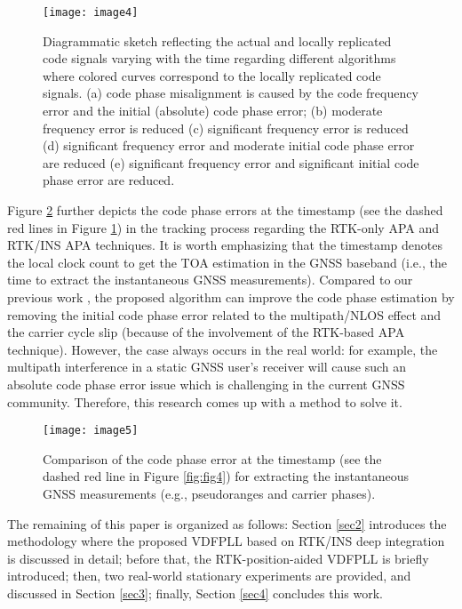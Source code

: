\documentclass{article}
\newcommand{\reffig}[1]{Figure \ref{#1}}
\begin{document}
\begin{figure}[htbp]%
\centerline{\texttt{[image: image4]}}%
\caption{Diagrammatic sketch reflecting the actual and locally replicated code signals varying with the time regarding different algorithms where colored curves correspond to the locally replicated code signals. (a) code phase misalignment is caused by the code frequency error and the initial (absolute) code phase error; (b) moderate frequency error is reduced (c) significant frequency error is reduced (d) significant frequency error and moderate initial code phase error are reduced (e) significant frequency error and significant initial code phase error are reduced.}%
\label{fig:fig1}%
\end{figure}


\reffig{fig:fig2} further depicts the code phase errors at the timestamp (see the dashed red lines in \reffig{fig:fig1}) in the tracking process regarding the RTK-only APA and RTK/INS APA techniques. It is worth emphasizing that the timestamp denotes the local clock count to get the TOA estimation in the GNSS baseband (i.e., the time to extract the instantaneous GNSS measurements). Compared to our previous work \cite{Luo2022aa}, the proposed algorithm can improve the code phase estimation by removing the initial code phase error related to the multipath/NLOS effect and the carrier cycle slip (because of the involvement of the RTK-based APA technique). However, the case always occurs in the real world: for example, the multipath interference in a static GNSS user's receiver will cause such an absolute code phase error issue which is challenging in the current GNSS community. Therefore, this research comes up with a method to solve it. 

\begin{figure}[htbp]%
\centerline{\texttt{[image: image5]}}
\caption{Comparison of the code phase error at the timestamp (see the dashed red line in \reffig{fig:fig4}) for extracting the instantaneous GNSS measurements (e.g., pseudoranges and carrier phases). }
\label{fig:fig2}
\end{figure}

The remaining of this paper is organized as follows: Section \ref{sec2} introduces the methodology where the proposed VDFPLL based on RTK/INS deep integration is discussed in detail; before that, the RTK-position-aided VDFPLL is briefly introduced; then, two real-world stationary experiments are provided, and discussed in Section \ref{sec3}; finally, Section \ref{sec4} concludes this work. 
\end{document}
